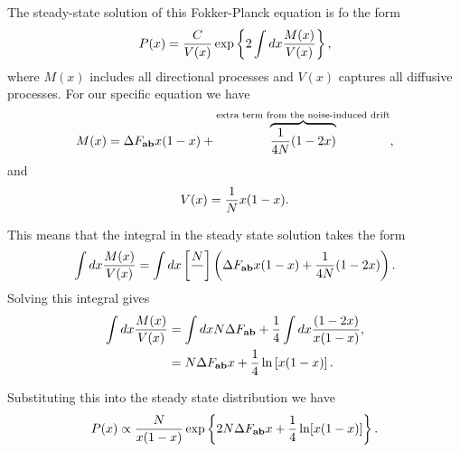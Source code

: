The steady-state solution of this Fokker-Planck equation is fo the form
\begin{equation}
  P(x) = {C \over V(x)} \exp \left\{ 2 \int dx {M(x) \over V(x)} \right\},
\end{equation}
where $M(x)$ includes all directional processes and $V(x)$ captures all
diffusive processes. For our specific equation we have
\begin{equation}
  M(x) = \Delta F_{\mathbf{ab}} x (1 - x) + \overbrace{{1 \over 4N} (1 - 2x)}^
  {\text{extra term from the noise-induced drift}},
\end{equation}
and
\begin{equation}
  V(x) = {1 \over N} x (1 - x).
\end{equation}

This means that the integral in the steady state solution takes the form
\begin{equation}
  \int dx {M(x) \over V(x)} = \int dx \left[ {N \over} \right]
  \left( \Delta F_{\mathbf{ab}} x (1 - x) + {1 \over 4N} (1 - 2x) \right).
\end{equation}
Solving this integral gives
\begin{align}
  \int dx {M(x) \over V(x)} &= \int dx N \Delta F_{\mathbf{ab}} +
  {1 \over 4} \int dx {(1 - 2x) \over x (1 - x)}, \\
  &= N \Delta F_{\mathbf{ab}} x + {1 \over 4} \ln \left[ x ( 1 - x) \right].
\end{align}

Substituting this into the steady state distribution we have
\begin{equation}
  P(x) \propto {N \over x (1 - x)} \exp \left\{ 2N \Delta F_{\mathbf{ab}} x +
  {1 \over 4} \ln[x (1 - x)] \right\}.
\end{equation}


